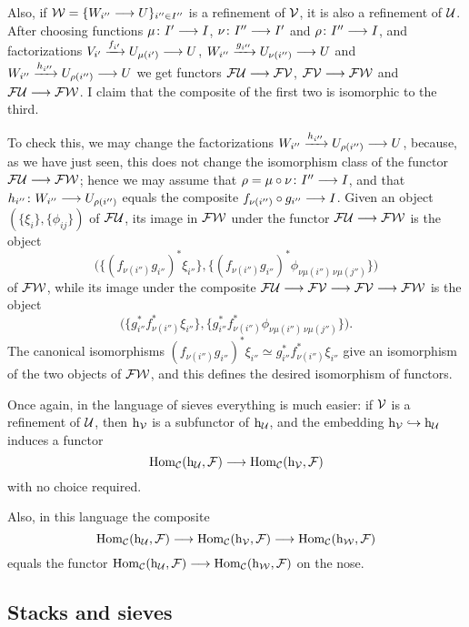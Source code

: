 \begin{4   STACKS}
\begin{4.1 Descent of objects of fibcats}
Also, if $\mathcal{W} = \{W_{i''} \longrightarrow U\}_{i'' \in I''}$ is a refinement of $\mathcal{V}$, it is also a refinement of $\mathcal{U}$. After choosing functions $\mu\colon I' \arr I$, $\nu\colon I'' \arr I'$ and $\rho\colon I'' \arr I$, and factorizations $V_{i'} \xrightarrow{f_{i'}} U_{\mu(i')} \arr U$, $W_{i''} \xrightarrow{g_{i''}} U_{\nu(i'')} \arr U$ and $W_{i''} \xrightarrow{h_{i''}} U_{\rho(i'')} \arr U$ we get functors $\cF\cU \arr \cF\cV$, $\cF\cV \arr \cF\cW$ and $\cF\cU \arr \cF\cW$. I claim that the composite of the first two is isomorphic to the third.

To check this, we may change the factorizations $W_{i''} \xrightarrow{h_{i''}} U_{\rho(i'')} \arr U$, because, as we have just seen, this does not change the isomorphism class of the functor $\cF\cU \arr \cF\cW$; hence we may assume that $\rho = \mu \circ \nu \colon I'' \arr I$, and that $h_{i''}\colon W_{i''} \arr U_{\rho(i'')}$ equals the composite $f_{\nu(i'')}\circ g_{i''} \arr I$. Given an object $(\{\xi_{i}\}, \{\phi_{ij}\})$ of $\mathcal{F}\mathcal{U}$, its image in $\mathcal{F}\mathcal{W}$ under the functor $\cF\cU \arr \cF\cW$ is the object
   \[
   \bigl(\{(f_{\nu(i'')} g_{i''})^{*}\xi_{i''}\},
      \{(f_{\nu(i'')} g_{i''})^{*}
      \phi_{\nu\mu(i'')\,\nu\mu(j'')}\}\bigr)
   \]
of $\mathcal{F}\mathcal{W}$, while its image under the composite $\cF\cU \arr \cF\cV \arr \cF\cV \arr \cF\cW$ is the object
   \[
   \bigl(\{g_{i''}^{*}%
   f_{\nu(i'')}^{*}\xi_{i''}\},
      \{g_{i''}^{*}f_{\nu(i'')}^{*}
      \phi_{\nu\mu(i'')\,\nu\mu(j'')}\}\bigr).
   \]
The canonical isomorphisms $(f_{\nu(i'')} g_{i''})^{*}\xi_{i''} \simeq g_{i''}^{*}f_{\nu(i'')}^{*}\xi_{i''}$ give an isomorphism of the two objects of $\mathcal{F}\mathcal{W}$, and this defines the desired isomorphism of functors.

Once again, in the language of sieves everything is much easier: if $\mathcal{V}$ is a refinement of $\mathcal{U}$, then $\mathrm{h}_{\mathcal{V}}$ is a subfunctor of $\mathrm{h}_{\mathcal{U}}$, and the embedding $\mathrm{h}_{\mathcal{V}} \hookrightarrow \mathrm{h}_{\mathcal{U}}$ induces a functor
   \[
   \hom_{\cC}(\h_{\cU}, \cF) \arr \hom_{\cC}(\h_{\cV}, \cF)
   \]
with no choice required. 

Also, in this language the composite 
   \[
   \hom_{\cC}(\h_{\cU}, \cF) \arr \hom_{\cC}(\h_{\cV}, \cF)
                             \arr \hom_{\cC}(\h_{\cW}, \cF)
   \]
equals the functor $\hom_{\cC}(\h_{\cU}, \cF) \arr \hom_{\cC}(\h_{\cW}, \cF)$ on the nose.


\subsection{Stacks and sieves}



\end{4.1 Descent of objects of fibcats}
\end{4   STACKS}
